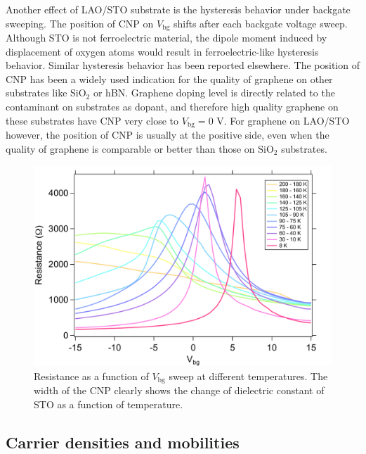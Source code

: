 \documentclass[pdflatex, sectionletters, 12pt]{pittetd}    %
\begin{document}
Another effect of LAO/STO substrate is the hysteresis behavior under backgate sweeping. The position of CNP on $V_\mathrm{bg}$ shifts after each backgate voltage sweep. Although STO is not ferroelectric material, the dipole moment induced by displacement of oxygen atoms would result in ferroelectric-like hysteresis behavior\cite{sachs2014ferroelectric}. Similar hysteresis behavior has been reported elsewhere\cite{jnawali2017room}. The position of CNP has been a widely used indication for the quality of graphene on other substrates like SiO$_2$ or hBN. Graphene doping level is directly related to the contaminant on substrates as dopant, and therefore high quality graphene on these substrates have CNP very close to $V_\mathrm{bg} = 0$ V. For graphene on LAO/STO however, the position of CNP is usually at the positive side, even when the quality of graphene is comparable or better than those on SiO$_2$ substrates. 
\\

\begin{figure}[h!]
	\centering
	\includegraphics[width=.8\textwidth]{Drawing/ResistanceTemp.pdf}
	\caption{Resistance as a function of $V_\mathrm{bg}$ sweep at different temperatures. The width of the CNP clearly shows the change of dielectric constant of STO as a function of temperature.}
	\label{FIG:ResistanceTemp}
\end{figure}

\subsection{Carrier densities and mobilities}
\end{document}
